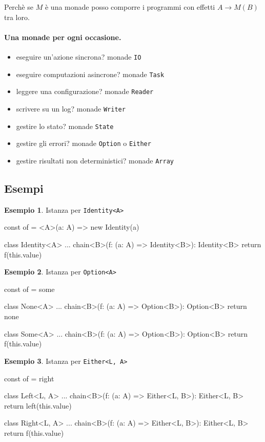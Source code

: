 \documentclass[12pt]{article}
\theoremstyle{definition}
\newtheorem{example}{Esempio}[section]
\newenvironment{code}
  {\vspace{0.5cm} \VerbatimEnvironment\begin{typescriptcode}}
  {\end{typescriptcode} \vspace{0.2cm}}
\begin{document}
Perchè se $M$ è una monade posso comporre i programmi con effetti $A \rightarrow M(B)$ tra loro.

\paragraph{Una monade per ogni occasione.}

\begin{itemize}
  \item eseguire un'azione sincrona? monade \texttt{IO}
  \item eseguire computazioni asincrone? monade \texttt{Task}
  \item leggere una configurazione? monade \texttt{Reader}
  \item scrivere su un log? monade \texttt{Writer}
  \item gestire lo stato? monade \texttt{State}
  \item gestire gli errori? monade \texttt{Option} o \texttt{Either}
  \item gestire risultati non deterministici? monade \texttt{Array}
\end{itemize}

\subsection{Esempi}

\begin{example}
Istanza per \texttt{Identity<A>}

\begin{code}
const of = <A>(a: A) => new Identity(a)

class Identity<A> {
  ...
  chain<B>(f: (a: A) => Identity<B>): Identity<B> {
    return f(this.value)
  }
}
\end{code}
\end{example}

\begin{example}
Istanza per \texttt{Option<A>}

\begin{code}
const of = some

class None<A> {
  ...
  chain<B>(f: (a: A) => Option<B>): Option<B> {
    return none
  }
}

class Some<A> {
  ...
  chain<B>(f: (a: A) => Option<B>): Option<B> {
    return f(this.value)
  }
}
\end{code}
\end{example}

\begin{example}
Istanza per \texttt{Either<L, A>}

\begin{code}
const of = right

class Left<L, A> {
  ...
  chain<B>(f: (a: A) => Either<L, B>): Either<L, B> {
    return left(this.value)
  }
}

class Right<L, A> {
  ...
  chain<B>(f: (a: A) => Either<L, B>): Either<L, B> {
    return f(this.value)
  }
}
\end{code}
\end{example}
\end{document}
